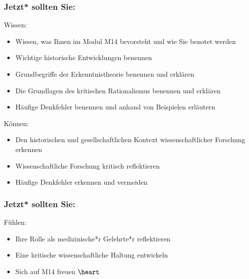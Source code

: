 \documentclass{beamer}
\begin{document}
\begin{frame}

\frametitle{Jetzt* sollten Sie:}



\begin{block}{Wissen:}
\begin{itemize}
\item
Wissen, was Ihnen im Modul M14 bevorsteht und wie Sie benotet werden

\item
Wichtige historische Entwicklungen benennen
\item 
Grundbegriffe der Erkenntnistheorie benennen und erklären
\item 
Die Grundlagen des kritischen Rationalismus benennen und erklären
\item 
Häufige Denkfehler benennen und anhand von Beispielen erläutern
\end{itemize}

\end{block}

 

\begin{block}{Können:}
\begin{itemize}
\item
Den historischen und gesellschaftlichen Kontext wissenschaftlicher Forschung erkennen
\item 
Wissenschaftliche Forschung kritisch reflektieren
\item 
Häufige Denkfehler erkennen und vermeiden
\end{itemize}
\end{block}

\end{frame}


\begin{frame}

\frametitle{Jetzt* sollten Sie:}

\begin{block}{Fühlen:}

\begin{itemize}
\item
Ihre Rolle als medizinische*r Gelehrte*r reflektieren
\item 
Eine kritische wissenschaftliche Haltung entwickeln
\item 
Sich auf M14 freuen $\heart$
\end{itemize}

\end{block}


\end{frame}
\end{document}
